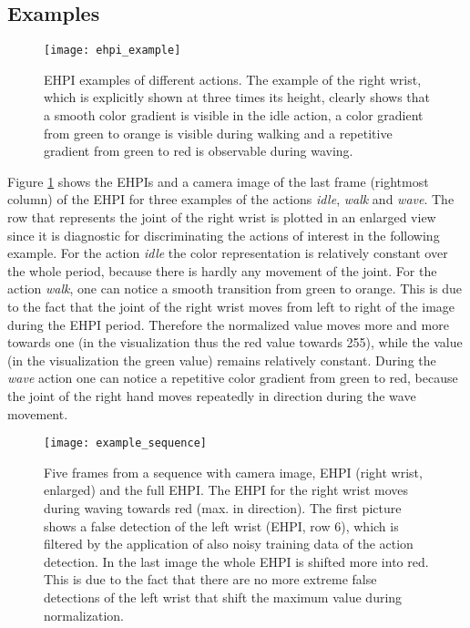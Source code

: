 \documentclass[a4paper, 10pt, conference]{ieeeconf}
\begin{document}
\begin{minipage}{\textwidth}
\subsection{Examples}
\begin{figure}
  \centering
  \texttt{[image: ehpi\_example]}
  \caption{EHPI examples of different actions. The example of the right wrist, which is explicitly shown at three times its height, clearly shows that a smooth color gradient is visible in the idle action, a color gradient from green to orange is visible during walking and a repetitive gradient from green to red is observable during waving.}
  \label{fig:ehpi_example}
\end{figure}
Figure \ref{fig:ehpi_example} shows the EHPIs and a camera image of the last frame (rightmost column) of the EHPI for three examples of the actions \textit{idle}, \textit{walk} and \textit{wave}. The row that represents the joint of the right wrist is plotted in an enlarged view since it is diagnostic for discriminating the actions of interest in the following example. For the action \textit{idle} the color representation is relatively constant over the whole period, because there is hardly any movement of the joint. For the action \textit{walk}, one can notice a smooth transition from green to orange. This is due to the fact that the joint of the right wrist moves from left to right of the image during the EHPI period. Therefore the normalized  value moves more and more towards one (in the visualization thus the red value towards 255), while the  value (in the visualization the green value) remains relatively constant. During the \textit{wave} action one can notice a repetitive color gradient from green to red, because the joint of the right hand moves repeatedly in  direction during the wave movement.

\begin{figure}
  \centering
  \texttt{[image: example\_sequence]}
  \caption{Five frames from a sequence with camera image, EHPI (right wrist, enlarged) and the full EHPI. The EHPI for the right wrist moves during waving towards red (max. in  direction). The first picture shows a false detection of the left wrist (EHPI, row 6), which is filtered by the application of also noisy training data of the action detection. In the last image the whole EHPI is shifted more into red. This is due to the fact that there are no more extreme false detections of the left wrist that shift the maximum  value during normalization.}
  \label{fig:example_sequence}
\end{figure}


\end{minipage}
\end{document}
